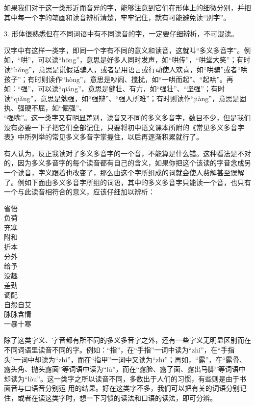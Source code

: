 如果我们对于这一类形近而音异的字，能够注意到它们在形体上的细微分别，并把其中每一个字的笔画和读音辨析清楚，牢牢记住，就有可能避免读“别字”。

3. 形体很熟悉但在不同词语中有不同读音的字，一定要仔细辨析，不可混读。

汉字中有这样一类字，即同一个字有不同的意义和读音，这就叫“多义多音字”。例如，“哄”，可以读“hōng”，意思是好多人同时发声，如“哄传”，“哄堂大笑”；有时读“hǒng”，意思是说假话骗人，或者是用语言或行动使人欢喜，如“哄骗”或者“哄孩子”；有时则读作“hòng”，意思是吵闹、搅扰，如“一哄而起”、“起哄”。再如：“强”，可以读“qiáng”，意思是健壮、有力，如“强壮”、“坚强”；有时读“qiǎng”，意思是勉强，如“强辩”、“强人所难”；有时则读作“jiàng”，意思是固执、强硬不屈，如“倔强”、\\
“强嘴”。这一类字又有明显差别，读音又不同的多义多音字，数目不少，但是我们没有必要一下子把它们全部记住，只要将初中语文课本所附的《常见多义多音字表》中所列举的常见多义多音字掌握住，以后再逐渐积累就行了。

有人认为，反正我读对了多义多音字的一个音，不能算是什么错。这种看法是不对的，因为多义多音字的每个读音都有自己的含义，如果你把这个该读的字音念成另一个读音，字义跟着也改变了，那么由这个字所组成的词就会使人费解甚至误解了。例如下面由多义多音字所组的词语，其中的多义多音字只能读一个音，也只有一个与此读音相符合的意义，应该仔细加以辨析：
\begin{center}
    \noindent
    省悟\\
    负荷\\
    充塞\\
    附和\\
    折本\\
    分外\\
    给予\\
    没趣\\
    差劲\\
    调配\\
    自怨自艾\\
    脉脉含情\\
    一暴十寒\\
\end{center}

除了这类字义、字音都有所不同的多义多音字之外，还有一些字义无明显区别而在不同词语里读音不同的字。例如：“指”，在“手指”一词中读为“zhǐ”，在“手指头”一词中却读为“zhí”，而在“指甲”一词中又读为“zhī”；再如，“露”，在“露骨、露头角、抛头露面”等词语中读为“lù”，而在“露脸、露了面、露出马脚”等词语中却读为“lòu”。这一类字之所以读音不同，多数出于人们的习惯，有些则是由于书面音与口语音分别运
用的结果。好在这类字不多，我们可以把有关的词语分别记住，或者在读这类字时，想一下习惯的读法和口语的读法，即可分辨。
\newpage